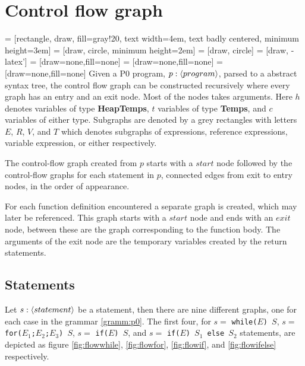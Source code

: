 \section{Control flow graph}
 = [rectangle, draw, fill=gray!20, text width=4em, text badly centered, minimum height=3em]
 = [draw, circle, minimum height=2em]
 = [draw, circle]
 = [draw, -latex']
 = [draw=none,fill=none]
 = [draw=none,fill=none]
 = [draw=none,fill=none]
Given a P0 program, $p : \langle program\rangle$, parsed to a abstract syntax tree, the control flow graph can be constructed recursively where every graph has an entry and an exit node. Most of the nodes takes arguments. Here $h$ denotes variables of type {\bf HeapTemps}, $t$ variables of type {\bf Temps}, and $c$ variables of either type. Subgraphs are denoted by a grey rectangles with letters $E$, $R$, $V$, and $T$ which denotes subgraphs of expressions, reference expressions, variable expression, or either respectively. 

The control-flow graph created from $p$ starts with a $start$ node followed by the control-flow graphs for each statement in $p$, connected edges from exit to entry nodes, in the order of appearance. 

For each function definition encountered a separate graph is created, which may later be referenced. This graph starts with a $start$ node and ends with an $exit$ node, between these are the graph corresponding to the function body. The arguments of the exit node are the temporary variables created by the return statements. 

\subsection{Statements}
Let $s : \langle statement\rangle$ be a statement, then there are nine different graphs, one for each case in the grammar \ref{gramm:p0}. The first four, for $s = $ \texttt{while($E$) $S$}, $s = $ \texttt{for($E_1$;$ E_2$;$E_3$) $S$}, $s = $ \texttt{if($E$) $S$}, and $s = $ \texttt{if($E$) $S_1$ else $S_2$} statements, are depicted as figure \ref{fig:flowwhile}, \ref{fig:flowfor}, \ref{fig:flowif}, and \ref{fig:flowifelse} respectively.


